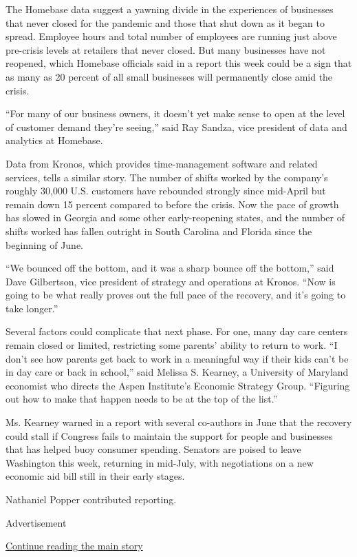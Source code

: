 The Homebase data suggest a yawning divide in the experiences of
businesses that never closed for the pandemic and those that shut down
as it began to spread. Employee hours and total number of employees are
running just above pre-crisis levels at retailers that never closed. But
many businesses have not reopened, which Homebase officials said in a
report this week could be a sign that as many as 20 percent of all small
businesses will permanently close amid the crisis.

``For many of our business owners, it doesn't yet make sense to open at
the level of customer demand they're seeing,'' said Ray Sandza, vice
president of data and analytics at Homebase.

Data from Kronos, which provides time-management software and related
services, tells a similar story. The number of shifts worked by the
company's roughly 30,000 U.S. customers have rebounded strongly since
mid-April but remain down 15 percent compared to before the crisis. Now
the pace of growth has slowed in Georgia and some other early-reopening
states, and the number of shifts worked has fallen outright in South
Carolina and Florida since the beginning of June.

``We bounced off the bottom, and it was a sharp bounce off the bottom,''
said Dave Gilbertson, vice president of strategy and operations at
Kronos. ``Now is going to be what really proves out the full pace of the
recovery, and it's going to take longer.''

Several factors could complicate that next phase. For one, many day care
centers remain closed or limited, restricting some parents' ability to
return to work. ``I don't see how parents get back to work in a
meaningful way if their kids can't be in day care or back in school,''
said Melissa S. Kearney, a University of Maryland economist who directs
the Aspen Institute's Economic Strategy Group. ``Figuring out how to
make that happen needs to be at the top of the list.''

Ms. Kearney warned in a report with several co-authors in June that the
recovery could stall if Congress fails to maintain the support for
people and businesses that has helped buoy consumer spending. Senators
are poised to leave Washington this week, returning in mid-July, with
negotiations on a new economic aid bill still in their early stages.

Nathaniel Popper contributed reporting.

Advertisement

\protect\hyperlink{after-bottom}{Continue reading the main story}

